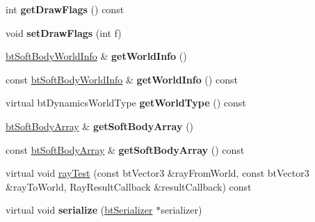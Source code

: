 \begin{DoxyCompactItemize}
\mbox{\label{classbtSoftRigidDynamicsWorld_aae4e4b95d837cbcd267fedc805dbf8cf}} 
int {\bfseries get\+Draw\+Flags} () const
\item 
\mbox{\label{classbtSoftRigidDynamicsWorld_ad982fb770a12204e59a19dedeff32ae4}} 
void {\bfseries set\+Draw\+Flags} (int f)
\item 
\mbox{\label{classbtSoftRigidDynamicsWorld_adf7ee702dee979e4120ce536eb95e695}} 
\hyperlink{structbtSoftBodyWorldInfo}{bt\+Soft\+Body\+World\+Info} \& {\bfseries get\+World\+Info} ()
\item 
\mbox{\label{classbtSoftRigidDynamicsWorld_af3314ba1f25bee62f21a8706c713523f}} 
const \hyperlink{structbtSoftBodyWorldInfo}{bt\+Soft\+Body\+World\+Info} \& {\bfseries get\+World\+Info} () const
\item 
\mbox{\label{classbtSoftRigidDynamicsWorld_a1b90318fc6210a1377824a4f2b07e3bb}} 
virtual bt\+Dynamics\+World\+Type {\bfseries get\+World\+Type} () const
\item 
\mbox{\label{classbtSoftRigidDynamicsWorld_a4cf515c1e5bab7952f0a26c535aa7da8}} 
\hyperlink{classbtAlignedObjectArray}{bt\+Soft\+Body\+Array} \& {\bfseries get\+Soft\+Body\+Array} ()
\item 
\mbox{\label{classbtSoftRigidDynamicsWorld_ae7ab53717a92b9d34cf8178221733be0}} 
const \hyperlink{classbtAlignedObjectArray}{bt\+Soft\+Body\+Array} \& {\bfseries get\+Soft\+Body\+Array} () const
\item 
virtual void \hyperlink{classbtSoftRigidDynamicsWorld_a74c164267415b885bba55a2bf319b337}{ray\+Test} (const bt\+Vector3 \&ray\+From\+World, const bt\+Vector3 \&ray\+To\+World, Ray\+Result\+Callback \&result\+Callback) const
\item 
\mbox{\label{classbtSoftRigidDynamicsWorld_ac7770632b7372c54d2d85d33109bcfbf}} 
virtual void {\bfseries serialize} (\hyperlink{classbtSerializer}{bt\+Serializer} $\ast$serializer)
\end{DoxyCompactItemize}
